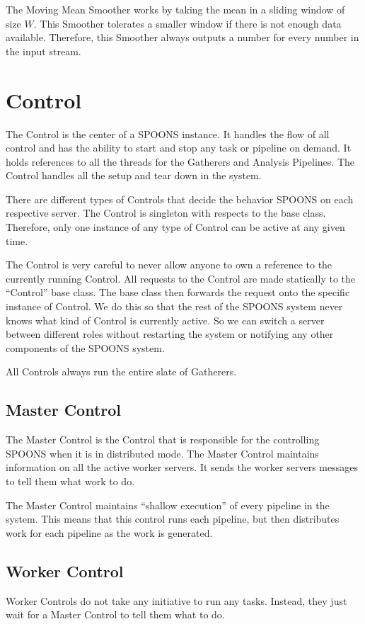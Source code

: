 \documentclass[12pt]{ucthesis}
\begin{document}
The Moving Mean Smoother works by taking the mean in a sliding window of size $W$.
This Smoother tolerates a smaller window if there is not enough data available.
Therefore, this Smoother always outputs a number for every number in the input stream.

\section{Control}
\label{arch-control}
The Control is the center of a SPOONS instance. It handles the flow of all control and has the ability to start and
stop any task or pipeline on demand. It holds references to all the threads for the Gatherers and Analysis Pipelines.
The Control handles all the setup and tear down in the system.

There are different types of Controls that decide the behavior SPOONS on each respective server.
The Control is singleton with respects to the base class. Therefore, only one instance of any type of Control can be
active at any given time.

The Control is very careful to never allow anyone to own a reference to the currently running Control.
All requests to the Control are made statically to the ``Control'' base class. The base class then forwards the
request onto the specific instance of Control. We do this so that the rest of the SPOONS system never knows
what kind of Control is currently active. So we can switch a server between different roles without restarting the
system or notifying any other components of the SPOONS system.

All Controls always run the entire slate of Gatherers.

\subsection{Master Control}
\label{arch-master-control}
The Master Control is the Control that is responsible for the controlling SPOONS when it is in distributed mode.
The Master Control maintains information on all the active worker servers. It sends the worker servers
messages to tell them what work to do.

The Master Control maintains ``shallow execution'' of every pipeline in the system.
This means that this control runs each pipeline, but then distributes work for each pipeline as the work is generated.

\subsection{Worker Control}
\label{arch-worker-control}
Worker Controls do not take any initiative to run any tasks. Instead, they just wait for a Master Control to tell them what to do.
\end{document}
